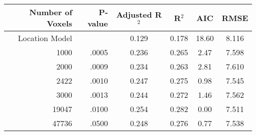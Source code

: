 \begin{table}[H]
\centering
\begin{tabular}{rr|cccc}
  \hline
{\bf Number of Voxels} & {\bf P-value} & {\bf Adjusted R$^2$} & {\bf R$^2$} & {\bf AIC} & {\bf RMSE} \\ 
  \hline
Location Model &  & 0.129 & 0.178 & 18.60 & 8.116 \\ 
  1000 & .0005 & 0.236 & 0.265 & 2.47 & 7.598 \\ 
  2000 & .0009 & 0.234 & 0.263 & 2.81 & 7.610 \\ 
  2422 & .0010 & 0.247 & 0.275 & 0.98 & 7.545 \\ 
  3000 & .0013 & 0.244 & 0.272 & 1.46 & 7.562 \\ 
  19047 & .0100 & 0.254 & 0.282 & 0.00 & 7.511 \\ 
  47736 & .0500 & 0.248 & 0.276 & 0.77 & 7.538 \\ 
   \hline
\end{tabular}
\label{t:nihss}
\end{table}

